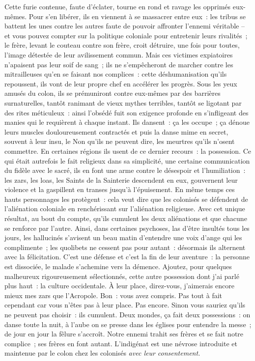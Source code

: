 \documentclass[french,twoside]{book} %
\begin{document}
Cette furie contenue, faute d’éclater, tourne en rond et ravage les opprimés eux-mêmes. Pour s’en libérer, ils en viennent à se massacrer entre eux : les tribus se battent les unes contre les autres faute de pouvoir affronter l’ennemi véritable – et vous pouvez compter sur la politique coloniale pour entretenir leurs rivalités ; le frère, levant le couteau contre son frère, croit détruire, une fois pour toutes, l’image détestée de leur avilissement commun. Mais ces victimes expiatoires n’apaisent pas leur soif de sang ; ils ne s’empêcheront de marcher contre les mitrailleuses qu’en se faisant nos complices : cette déshumanisation qu’ils repoussent, ils vont de leur propre chef en accélérer les progrès. Sous les yeux amusés du colon, ils se prémuniront contre eux-mêmes par des barrières surnaturelles,   tantôt ranimant de vieux mythes terribles, tantôt se ligotant par des rites méticuleux : ainsi l’obsédé fuit son exigence profonde en s’infligeant des manies qui le requièrent à chaque instant. Ils dansent : ça les occupe ; ça dénoue leurs muscles douloureusement contractés et puis la danse mime en secret, souvent à leur insu, le Non qu’ils ne peuvent dire, les meurtres qu’ils n’osent commettre. En certaines régions ils usent de ce dernier recours : la possession. Ce qui était autrefois le fait religieux dans sa simplicité, une certaine communication du fidèle avec le sacré, ils en font une arme contre le désespoir et l’humiliation : les zars, les loas, les Saints de la Sainterie descendent en eux, gouvernent leur violence et la gaspillent en transes jusqu’à l’épuisement. En même temps ces hauts personnages les protègent : cela veut dire que les colonisés se défendent de l’aliénation coloniale en renchérissant sur l’aliénation religieuse. Avec cet unique résultat, au bout du compte, qu’ils cumulent les deux aliénations et que chacune se renforce par l’autre. Ainsi, dans certaines psychoses, las d’être insultés tous les jours, les hallucinés s’avisent un beau matin d’entendre une voix d’ange qui les complimente ; les quolibets ne cessent pas pour autant : désormais ils alternent avec la félicitation. C’est une défense et c’est la fin de leur aventure : la personne est dissociée, le malade s’achemine vers la démence. Ajoutez, pour quelques malheureux rigoureusement sélectionnés, cette autre possession dont j’ai parlé plus haut : la culture occidentale. À leur place, direz-vous, j’aimerais encore mieux mes zars que l’Acropole. Bon : vous avez compris. Pas tout à fait cependant car vous n’êtes pas à leur place. Pas encore. Sinon vous sauriez qu’ils ne peuvent pas choisir : ils cumulent. Deux mondes, ça fait deux possessions : on danse toute la nuit, à l’aube on se presse dans les églises pour entendre la messe ; de jour en jour la fêlure s’accroît. Notre ennemi trahit ses frères et se fait notre complice ; ses frères en font autant. L’indigénat est une névrose introduite et maintenue par le colon chez les colonisés \emph{avec leur consentement.}\par
\end{document}
